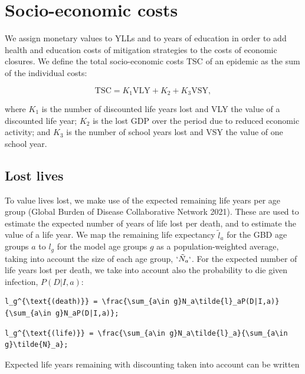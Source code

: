 \documentclass[
]{article}
\begin{document}
\hypertarget{socio-economic-costs}{%
\section{Socio-economic costs}\label{socio-economic-costs}}

We assign monetary values to YLLs and to years of education in order to add health and education costs of mitigation strategies to the costs of economic closures. We define the total socio-economic costs TSC of an epidemic as the sum of the individual costs:

\begin{equation}
\text{TSC} = K_1\text{VLY} + K_2 + K_3\text{VSY},
\label{eq:swf}
\end{equation}

where \(K_1\) is the number of discounted life years lost and VLY the value of a discounted life year; \(K_2\) is the lost GDP over the period due to reduced economic activity; and \(K_3\) is the number of school years lost and VSY the value of one school year.

\hypertarget{lost-lives}{%
\subsection{Lost lives}\label{lost-lives}}

To value lives lost, we make use of the expected remaining life years per age group (Global Burden of Disease Collaborative Network 2021). These are used to estimate the expected number of years of life lost per death, and to estimate the value of a life year. We map the remaining life expectancy \(\tilde{l}_a\) for the GBD age groups \(a\) to \(l_g\) for the model age groups \(g\) as a population-weighted average, taking into account the size of each age group, \(`\tilde{N}_a`\). For the expected number of life years lost per death, we take into account also the probability to die given infection, \(P(D|I,a)\):

\begin{verbatim}
l_g^{\text{(death)}} = \frac{\sum_{a\in g}N_a\tilde{l}_aP(D|I,a)}{\sum_{a\in g}N_aP(D|I,a)}; 
\end{verbatim}

\begin{verbatim}
l_g^{\text{(life)}} = \frac{\sum_{a\in g}N_a\tilde{l}_a}{\sum_{a\in g}\tilde{N}_a}; 
\end{verbatim}

Expected life years remaining with discounting taken into account can be written
\end{document}
